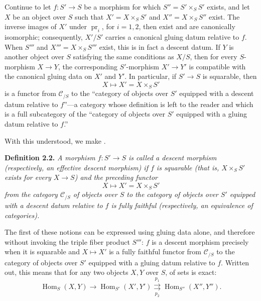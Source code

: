 Continue to let \(f:S'\to S\) be a morphism for which
\(S''=S'\times_SS'\) exists, and let \(X\) be an object over \(S\) such
that \(X'=X\times_SS'\) and \(X''=X\times_SS''\) exist. The inverse images
of \(X'\) under \(\operatorname{pr}_i\), for \(i=1,2\), then exist and are
canonically isomorphic; consequently, \(X'/S'\) carries a canonical gluing
datum relative to \(f\). When \(S'''\) and \(X'''=X\times_SS'''\) exist,
this is in fact a descent datum. If \(Y\) is another object over \(S\)
satisfying the same conditions as \(X/S\), then for every \(S\)-morphism
\(X\to Y\), the corresponding \(S'\)-morphism \(X'\to Y'\) is compatible
with the canonical gluing data on \(X'\) and \(Y'\). In particular, if
\(S'\to S\) is squarable, then
\[
  X\longmapsto X'=X\times_SS'
\]
is a functor from \(\mathscr C_{/S}\) to the ``category of objects over
\(S'\) equipped with a descent datum relative to \(f\)''---a category whose
definition is left to the reader and which is a full subcategory of the
``category of objects over \(S'\) equipped with a gluing datum relative to
\(f\).''

With this understood, we make .

\medskip
\noindent{}\textbf{Definition 2.2.}
\textit{A morphism \(f:S'\to S\) is called a \emph{descent morphism}
(respectively, an \emph{effective descent morphism}) if \(f\) is squarable
(that is, \(X\times_SS'\) exists for every \(X\to S\)) and the preceding
functor}
\[
  X\longmapsto X'=X\times_SS'
\]
\textit{from the category \(\mathscr C_{/S}\) of objects over \(S\) to the
category of objects over \(S'\) equipped with a descent datum relative to
\(f\) is fully faithful (respectively, an equivalence of categories).}

The first of these notions can be expressed using gluing data alone, and
therefore without invoking the triple fiber product \(S'''\): \(f\) is a
descent morphism precisely when it is squarable and \(X\mapsto X'\) is a
fully faithful functor from \(\mathscr C_{/S}\) to the category of objects
over \(S'\) equipped with a gluing datum relative to \(f\). Written out, this
means that for any two objects \(X,Y\) over \(S\),  of
sets is exact:
\[
\tag{x}\label{sga3:iv:definition:2:2:eq:x:01}
  \operatorname{Hom}_S(X,Y)
  \longrightarrow \operatorname{Hom}_{S'}(X',Y')
  \overset{p_1}{\underset{p_2}{\rightrightarrows}}
  \operatorname{Hom}_{S''}(X'',Y'').
\]

